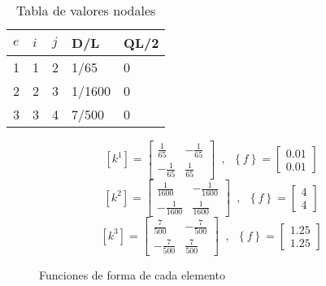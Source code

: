 \documentclass{article}
\begin{document}
\begin{table}[!h]
    \centering
        \begin{tabular}{@{}lllll@{}}
        \toprule
        $e$ & $i$ & $j$ & D/L    & QL/2 \\ \midrule
        1 & 1 & 2 & 1/65   & 0    \\
        2 & 2 & 3 & 1/1600 & 0    \\
        3 & 3 & 4 & 7/500  & 0    \\ \bottomrule
    \end{tabular}
    \caption{Tabla de valores nodales}
\end{table}

\begin{figure}[!h]
    \begin{equation}
        \left [ k^{1} \right ]= \begin{bmatrix}
        \frac{1}{65} & -\frac{1}{65}\\ 
        -\frac{1}{65} & \frac{1}{65}
        \end{bmatrix}\phantom{a},\phantom{a}
        \left \{ f \right \}=\begin{bmatrix}
        0.01\\0.01
        \end{bmatrix}
    \end{equation}
    \begin{equation}
        \left [ k^{2} \right ]= \begin{bmatrix}
        \frac{1}{1600} & -\frac{1}{1600}\\ 
        -\frac{1}{1600} & \frac{1}{1600}
        \end{bmatrix}\phantom{a},\phantom{a}
        \left \{ f \right \}=\begin{bmatrix}
        4\\4
        \end{bmatrix}
    \end{equation}
    \begin{equation}
        \left [ k^{3} \right ]= \begin{bmatrix}
        \frac{7}{500} & -\frac{7}{500}\\ 
        -\frac{7}{500} & \frac{7}{500}
        \end{bmatrix}\phantom{a},\phantom{a}
        \left \{ f \right \}=\begin{bmatrix}
        1.25\\1.25
        \end{bmatrix}
    \end{equation}
    \caption{Funciones de forma de cada elemento}
\end{figure}
\end{document}

